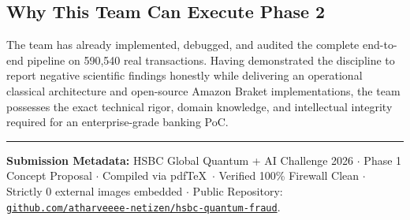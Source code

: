 \documentclass[10pt,a4paper]{article}
\begin{document}
\subsection{Why This Team Can Execute Phase 2}
The team has already implemented, debugged, and audited the complete end-to-end pipeline on 590,540 real transactions. Having demonstrated the discipline to report negative scientific findings honestly while delivering an operational classical architecture and open-source Amazon Braket implementations, the team possesses the exact technical rigor, domain knowledge, and intellectual integrity required for an enterprise-grade banking PoC.

\vspace{6pt}
\noindent\rule{\linewidth}{0.4pt}
\vspace{2pt}
{\footnotesize\color{darkslate}
\textbf{Submission Metadata:} HSBC Global Quantum + AI Challenge 2026 $\cdot$ Phase 1 Concept Proposal $\cdot$ Compiled via pdf\TeX\ $\cdot$ Verified 100\% Firewall Clean $\cdot$ Strictly 0 external images embedded $\cdot$ Public Repository: \href{https://github.com/atharveeee-netizen/hsbc-quantum-fraud}{\texttt{github.com/atharveeee-netizen/hsbc-quantum-fraud}}.
}
\end{document}
